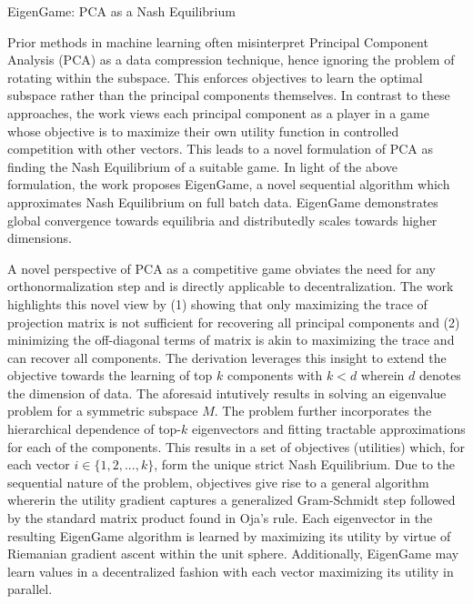 \documentclass[11pt,letterpaper]{article}
\begin{document}
\begin{center}
  \large{EigenGame: PCA as a Nash Equilibrium}
\end{center}

Prior methods in machine learning often misinterpret Principal Component Analysis (PCA) as a data compression technique, hence ignoring the problem of rotating within the subspace. This enforces objectives to learn the optimal subspace rather than the principal components themselves. In contrast to these approaches, the work views each principal component as a player in a game whose objective is to maximize their own utility function in controlled competition with other vectors. This leads to a novel formulation of PCA as finding the Nash Equilibrium of a suitable game. In light of the above formulation, the work proposes EigenGame, a novel sequential algorithm which approximates Nash Equilibrium on full batch data. EigenGame demonstrates global convergence towards equilibria and distributedly scales towards higher dimensions. 

A novel perspective of PCA as a competitive game obviates the need for any orthonormalization step and is directly applicable to decentralization. The work highlights this novel view by (1) showing that only maximizing the trace of projection matrix is not sufficient for recovering all principal components and (2) minimizing the off-diagonal terms of matrix is akin to maximizing the trace and can recover all components. The derivation leverages this insight to extend the objective towards the learning of top $k$ components with $k < d$ wherein $d$ denotes the dimension of data. The aforesaid intutively results in solving an eigenvalue problem for a symmetric subspace $M$. The problem further incorporates the hierarchical dependence of top-$k$ eigenvectors and fitting tractable approximations for each of the components. This results in a set of objectives (utilities) which, for each vector $i \in \{1,2,...,k\}$, form the unique strict Nash Equilibrium. Due to the sequential nature of the problem, objectives give rise to a general algorithm whererin the utility gradient captures a generalized Gram-Schmidt step followed by the standard matrix product found in Oja's rule. Each eigenvector in the resulting EigenGame algorithm is learned by maximizing its utility by virtue of Riemanian gradient ascent within the unit sphere. Additionally, EigenGame may learn values in a decentralized fashion with each vector maximizing its utility in parallel. 
\end{document}

